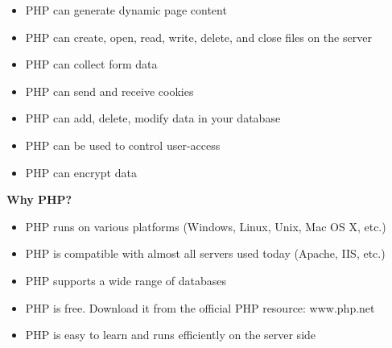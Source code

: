   \begin{itemize}
    \item PHP can generate dynamic page content
    \item PHP can create, open, read, write, delete, and close files on the server
     \item PHP can collect form data
     \item PHP can send and receive cookies
    \item  PHP can add, delete, modify data in your database
    \item PHP can be used to control user-access
     \item PHP can encrypt data\\
\end{itemize}
  {\bf Why PHP?}
 \begin{itemize}
 \item   PHP runs on various platforms (Windows, Linux, Unix, Mac OS X, etc.)
 \item   PHP is compatible with almost all servers used today (Apache, IIS, etc.)
\item    PHP supports a wide range of databases
 \item   PHP is free. Download it from the official PHP resource: www.php.net
 \item   PHP is easy to learn and runs efficiently on the server side
\end{itemize}





